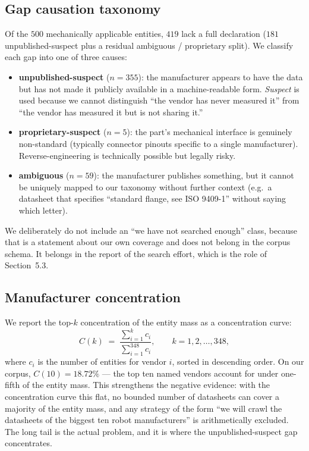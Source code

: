 \documentclass[review]{elsarticle}
\begin{document}
\subsection{Gap causation taxonomy}

Of the $500$ mechanically applicable entities, $419$ lack a full
declaration ($181$ unpublished-suspect plus a residual ambiguous /
proprietary split). We classify each gap into one of three causes:

\begin{itemize}[nosep,leftmargin=*]
\item \textbf{unpublished-suspect} ($n=355$): the manufacturer
appears to have the data but has not made it publicly available in a
machine-readable form. \emph{Suspect} is used because we cannot
distinguish ``the vendor has never measured it'' from ``the vendor
has measured it but is not sharing it.''

\item \textbf{proprietary-suspect} ($n=5$): the part's mechanical
interface is genuinely non-standard (typically connector pinouts
specific to a single manufacturer). Reverse-engineering is technically
possible but legally risky.

\item \textbf{ambiguous} ($n=59$): the manufacturer publishes
something, but it cannot be uniquely mapped to our taxonomy without
further context (e.g.\ a datasheet that specifies ``standard flange,
see ISO 9409-1'' without saying which letter).
\end{itemize}

We deliberately do not include an ``we have not searched enough''
class, because that is a statement about our own coverage and does
not belong in the corpus schema. It belongs in the report of the
search effort, which is the role of Section~5.3.

\subsection{Manufacturer concentration}

We report the top-$k$ concentration of the entity mass as a
concentration curve:
\begin{equation}
  C(k) \;=\; \frac{\sum_{i=1}^{k} c_i}{\sum_{i=1}^{348} c_i},
  \qquad k = 1, 2, \ldots, 348,
  \label{eq:conc}
\end{equation}
where $c_i$ is the number of entities for vendor $i$, sorted in
descending order. On our corpus, $C(10) = 18.72\%$ — the top ten
named vendors account for under one-fifth of the entity mass. This
strengthens the negative evidence: with the concentration curve this
flat, no bounded number of datasheets can cover a majority of the
entity mass, and any strategy of the form ``we will crawl the
datasheets of the biggest ten robot manufacturers'' is arithmetically
excluded. The long tail is the actual problem, and it is where the
unpublished-suspect gap concentrates.
\end{document}
